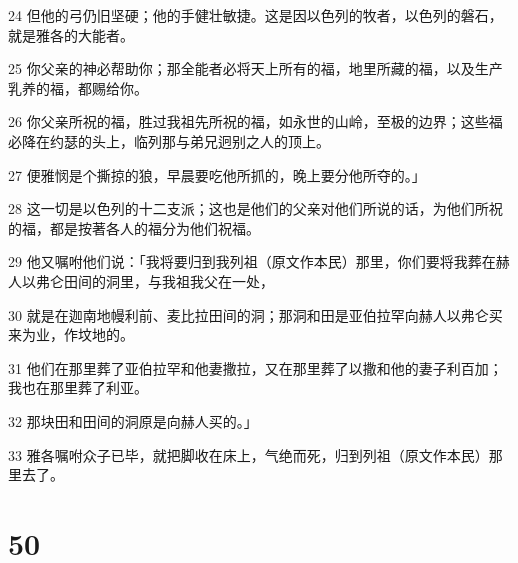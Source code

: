 \par 24 但他的弓仍旧坚硬；他的手健壮敏捷。这是因以色列的牧者，以色列的磐石，就是雅各的大能者。
\par 25 你父亲的神必帮助你；那全能者必将天上所有的福，地里所藏的福，以及生产乳养的福，都赐给你。
\par 26 你父亲所祝的福，胜过我祖先所祝的福，如永世的山岭，至极的边界；这些福必降在约瑟的头上，临列那与弟兄迥别之人的顶上。
\par 27 便雅悯是个撕掠的狼，早晨要吃他所抓的，晚上要分他所夺的。」
\par 28 这一切是以色列的十二支派；这也是他们的父亲对他们所说的话，为他们所祝的福，都是按著各人的福分为他们祝福。
\par 29 他又嘱咐他们说：「我将要归到我列祖（原文作本民）那里，你们要将我葬在赫人以弗仑田间的洞里，与我祖我父在一处，
\par 30 就是在迦南地幔利前、麦比拉田间的洞；那洞和田是亚伯拉罕向赫人以弗仑买来为业，作坟地的。
\par 31 他们在那里葬了亚伯拉罕和他妻撒拉，又在那里葬了以撒和他的妻子利百加；我也在那里葬了利亚。
\par 32 那块田和田间的洞原是向赫人买的。」
\par 33 雅各嘱咐众子已毕，就把脚收在床上，气绝而死，归到列祖（原文作本民）那里去了。

\chapter{50}

